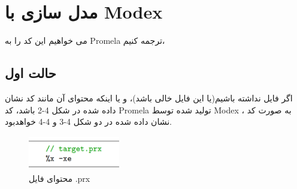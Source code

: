 \section{مدل سازی با Modex}
می خواهیم این کد را به Promela  ترجمه کنیم،
\subsection{حالت اول}
اگر فایل  نداشته باشیم(یا این فایل خالی باشد)، و یا اینکه محتوای آن مانند کد نشان داده شده در شکل 4-2 باشد، کد Promela تولید شده توسط Modex ، به صورت کد نشان داده شده در دو شکل 4-3 و 4-4 خواهدبود.

 \begin{figure}
	\centering
	\includegraphics[height=1.5cm,width=4cm]{c.png}
	\caption{محتوای فایل .prx}
	\centering
\end{figure}



